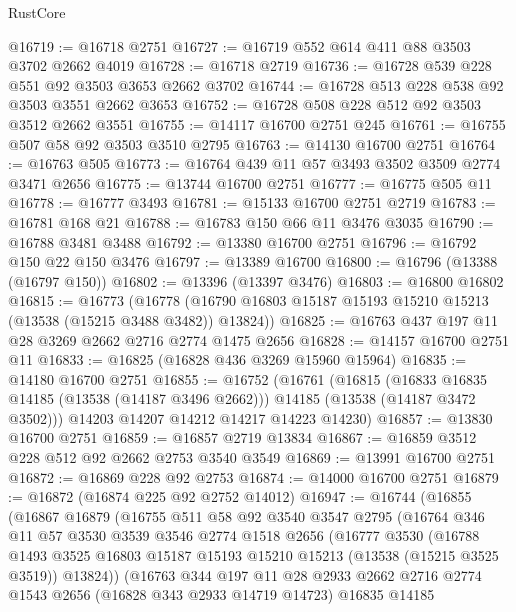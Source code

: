 \begin{lexlean}{RustCore}
\begin{coremodule}
@16719 := @16718 @2751
@16727 := @16719 @552 @614 @411 @88 @3503 @3702 @2662 @4019
@16728 := @16718 @2719
@16736 := @16728 @539 @228 @551 @92 @3503 @3653 @2662 @3702
@16744 := @16728 @513 @228 @538 @92 @3503 @3551 @2662 @3653
@16752 := @16728 @508 @228 @512 @92 @3503 @3512 @2662 @3551
@16755 := @14117 @16700 @2751 @245
@16761 := @16755 @507 @58 @92 @3503 @3510 @2795
@16763 := @14130 @16700 @2751
@16764 := @16763 @505
@16773 := @16764 @439 @11 @57 @3493 @3502 @3509 @2774 @3471 @2656
@16775 := @13744 @16700 @2751
@16777 := @16775 @505 @11
@16778 := @16777 @3493
@16781 := @15133 @16700 @2751 @2719
@16783 := @16781 @168 @21
@16788 := @16783 @150 @66 @11 @3476 @3035
@16790 := @16788 @3481 @3488
@16792 := @13380 @16700 @2751
@16796 := @16792 @150 @22 @150 @3476
@16797 := @13389 @16700
@16800 := @16796 (@13388 (@16797 @150))
@16802 := @13396 (@13397 @3476)
@16803 := @16800 @16802
@16815 := @16773
    (@16778 (@16790 @16803 @15187 @15193 @15210 @15213 (@13538 (@15215 @3488 @3482)) @13824))
@16825 := @16763 @437 @197 @11 @28 @3269 @2662 @2716 @2774 @1475 @2656
@16828 := @14157 @16700 @2751 @11
@16833 := @16825 (@16828 @436 @3269 @15960 @15964)
@16835 := @14180 @16700 @2751
@16855 := @16752
    (@16761
      (@16815
        (@16833 @16835 @14185 (@13538 (@14187 @3496 @2662)))
        @14185
        (@13538 (@14187 @3472 @3502)))
      @14203
      @14207
      @14212
      @14217
      @14223
      @14230)
@16857 := @13830 @16700 @2751
@16859 := @16857 @2719 @13834
@16867 := @16859 @3512 @228 @512 @92 @2662 @2753 @3540 @3549
@16869 := @13991 @16700 @2751
@16872 := @16869 @228 @92 @2753
@16874 := @14000 @16700 @2751
@16879 := @16872 (@16874 @225 @92 @2752 @14012)
@16947 := @16744
    (@16855
      (@16867
        @16879
        (@16755
          @511
          @58
          @92
          @3540
          @3547
          @2795
          (@16764
            @346
            @11
            @57
            @3530
            @3539
            @3546
            @2774
            @1518
            @2656
            (@16777
              @3530
              (@16788
                @1493
                @3525
                @16803
                @15187
                @15193
                @15210
                @15213
                (@13538 (@15215 @3525 @3519))
                @13824))
            (@16763
              @344
              @197
              @11
              @28
              @2933
              @2662
              @2716
              @2774
              @1543
              @2656
              (@16828 @343 @2933 @14719 @14723)
              @16835
              @14185

\end{coremodule}
\end{lexlean}
